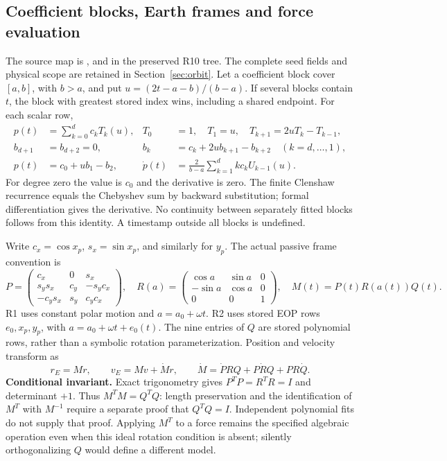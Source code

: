 \subsection{Coefficient blocks, Earth frames and force evaluation}
\label{sec:lift-orbit}
The source map is ,  and
 in the preserved R10 tree. The complete seed fields and
physical scope are retained in Section~\ref{sec:orbit}. Let a coefficient block
cover $[a,b]$, with $b>a$, and put $u=(2t-a-b)/(b-a)$. If several blocks contain
$t$, the block with greatest stored index wins, including a shared endpoint.
For each scalar row,
\begin{align}
 p(t)&=\sum_{k=0}^{d}c_kT_k(u), &
 T_0&=1,\quad T_1=u,\quad T_{k+1}=2uT_k-T_{k-1},\\
 b_{d+1}&=b_{d+2}=0, &
 b_k&=c_k+2u b_{k+1}-b_{k+2}\quad(k=d,\ldots,1),\\
 p(t)&=c_0+u b_1-b_2, &
 \dot p(t)&=\frac{2}{b-a}\sum_{k=1}^{d}k c_kU_{k-1}(u).
\end{align}
For degree zero the value is $c_0$ and the derivative is zero. The finite
Clenshaw recurrence equals the Chebyshev sum by backward substitution; formal
differentiation gives the derivative. No continuity between separately fitted
blocks follows from this identity. A timestamp outside all blocks is undefined.

Write $c_x=\cos x_p$, $s_x=\sin x_p$, and similarly for $y_p$. The actual passive
frame convention is
\begin{equation}
 P=\begin{pmatrix}c_x&0&s_x\\s_y s_x&c_y&-s_y c_x\\-c_y s_x&s_y&c_y c_x\end{pmatrix},
 \quad R(a)=\begin{pmatrix}\cos a&\sin a&0\\-\sin a&\cos a&0\\0&0&1\end{pmatrix},
 \quad M(t)=P(t)R(a(t))Q(t).
\end{equation}
R1 uses constant polar motion and $a=a_0+\omega t$. R2 uses stored EOP rows
$e_0,x_p,y_p$, with $a=a_0+\omega t+e_0(t)$. The nine entries of $Q$ are stored
polynomial rows, rather than a symbolic rotation parameterization. Position and
velocity transform as
\begin{equation}
 r_E=Mr,\qquad v_E=Mv+\dot Mr,\qquad
 \dot M=\dot PRQ+P\dot RQ+PR\dot Q.
\end{equation}
\textbf{Conditional invariant.} Exact trigonometry gives $P^TP=R^TR=I$ and
determinant $+1$. Thus $M^TM=Q^TQ$: length preservation and the identification of
$M^T$ with $M^{-1}$ require a separate proof that $Q^TQ=I$. Independent polynomial
fits do not supply that proof. Applying $M^T$ to a force remains the specified
algebraic operation even when this ideal rotation condition is absent; silently
orthogonalizing $Q$ would define a different model.

